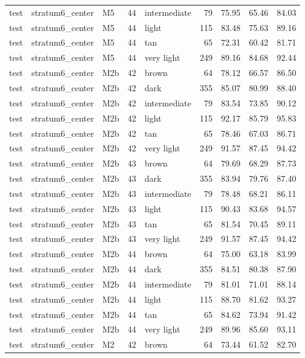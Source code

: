 \begin{tabular}{lllrlrrrr}
test & stratum6\_center & M5 & 44 & intermediate & 79 & 75.95 & 65.46 & 84.03 \\
test & stratum6\_center & M5 & 44 & light & 115 & 83.48 & 75.63 & 89.16 \\
test & stratum6\_center & M5 & 44 & tan & 65 & 72.31 & 60.42 & 81.71 \\
test & stratum6\_center & M5 & 44 & very light & 249 & 89.16 & 84.68 & 92.44 \\
test & stratum6\_center & M2b & 42 & brown & 64 & 78.12 & 66.57 & 86.50 \\
test & stratum6\_center & M2b & 42 & dark & 355 & 85.07 & 80.99 & 88.40 \\
test & stratum6\_center & M2b & 42 & intermediate & 79 & 83.54 & 73.85 & 90.12 \\
test & stratum6\_center & M2b & 42 & light & 115 & 92.17 & 85.79 & 95.83 \\
test & stratum6\_center & M2b & 42 & tan & 65 & 78.46 & 67.03 & 86.71 \\
test & stratum6\_center & M2b & 42 & very light & 249 & 91.57 & 87.45 & 94.42 \\
test & stratum6\_center & M2b & 43 & brown & 64 & 79.69 & 68.29 & 87.73 \\
test & stratum6\_center & M2b & 43 & dark & 355 & 83.94 & 79.76 & 87.40 \\
test & stratum6\_center & M2b & 43 & intermediate & 79 & 78.48 & 68.21 & 86.11 \\
test & stratum6\_center & M2b & 43 & light & 115 & 90.43 & 83.68 & 94.57 \\
test & stratum6\_center & M2b & 43 & tan & 65 & 81.54 & 70.45 & 89.11 \\
test & stratum6\_center & M2b & 43 & very light & 249 & 91.57 & 87.45 & 94.42 \\
test & stratum6\_center & M2b & 44 & brown & 64 & 75.00 & 63.18 & 83.99 \\
test & stratum6\_center & M2b & 44 & dark & 355 & 84.51 & 80.38 & 87.90 \\
test & stratum6\_center & M2b & 44 & intermediate & 79 & 81.01 & 71.01 & 88.14 \\
test & stratum6\_center & M2b & 44 & light & 115 & 88.70 & 81.62 & 93.27 \\
test & stratum6\_center & M2b & 44 & tan & 65 & 84.62 & 73.94 & 91.42 \\
test & stratum6\_center & M2b & 44 & very light & 249 & 89.96 & 85.60 & 93.11 \\
test & stratum6\_center & M2 & 42 & brown & 64 & 73.44 & 61.52 & 82.70 \\

\end{tabular}
